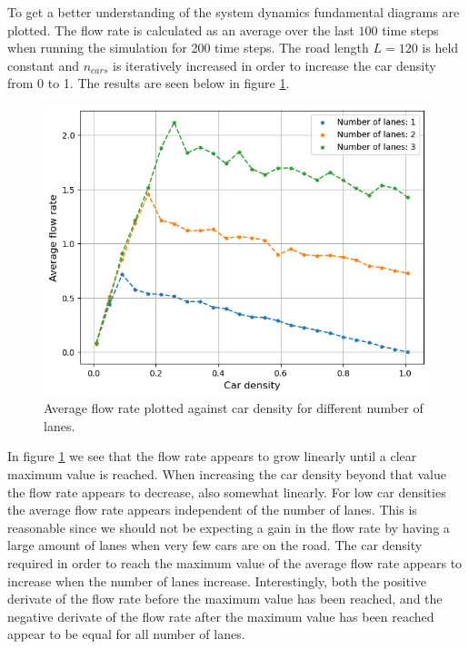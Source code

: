 \documentclass[a4paper,12pt]{article}
\begin{document}
To get a better understanding of the system dynamics fundamental diagrams are plotted. The flow rate is calculated as an average over the last $100$ time steps when running
the simulation for 200 time steps. The road length $L=120$ is held constant and $n_{cars}$ is iteratively
increased in order to increase the car density from 0 to 1. The results are seen below in figure \ref*{fundamental diagram}.

\begin{figure}[H]
    \centering
    \includegraphics[scale=0.9]{Images/fundamental diagram 120.png}
    \caption{Average flow rate plotted against car density for different number of lanes.}
    \label{fundamental diagram}
\end{figure}

In figure \ref*{fundamental diagram} we see that the flow rate appears to grow linearly until a clear maximum value is reached. When increasing the car density beyond
that value the flow rate appears to decrease, also somewhat linearly. For low car densities the average flow rate appears independent of the number of lanes.
This is reasonable since we should not be expecting a gain in the flow rate by having a large amount of lanes when very few cars are on the road.
The car density required in order to reach the maximum value of the average flow rate appears to increase when the number of lanes increase. Interestingly, both the positive derivate
of the flow rate before the maximum value has been reached, and the negative derivate of the flow rate after the maximum value has been reached appear to be equal for all
number of lanes. 
\end{document}
